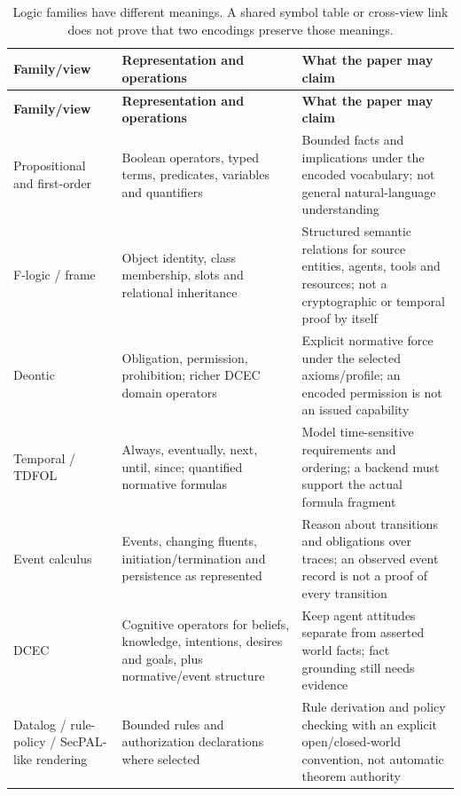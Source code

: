 \begingroup
\renewcommand{\thetable}{B1}
\begin{longtable}{@{}>{\raggedright\arraybackslash}p{.24\linewidth} >{\raggedright\arraybackslash}p{.32\linewidth} >{\raggedright\arraybackslash}p{.38\linewidth}@{}}
\caption{Logic families have different meanings. A shared symbol table or cross-view link does not prove that two encodings preserve those meanings.}\label{tab:B1}\\
\toprule
\textbf{Family/view} & \textbf{Representation and operations} & \textbf{What the paper may claim} \\
\midrule
\endfirsthead
\textbf{Family/view} & \textbf{Representation and operations} & \textbf{What the paper may claim} \\
\midrule
\endhead
\bottomrule
\endlastfoot
Propositional and first-order & Boolean operators, typed terms, predicates, variables and quantifiers & Bounded facts and implications under the encoded vocabulary; not general natural-language understanding \\[3pt]
F-logic / frame & Object identity, class membership, slots and relational inheritance & Structured semantic relations for source entities, agents, tools and resources; not a cryptographic or temporal proof by itself \\[3pt]
Deontic & Obligation, permission, prohibition; richer DCEC domain operators & Explicit normative force under the selected axioms/profile; an encoded permission is not an issued capability \\[3pt]
Temporal / TDFOL & Always, eventually, next, until, since; quantified normative formulas & Model time-sensitive requirements and ordering; a backend must support the actual formula fragment \\[3pt]
Event calculus & Events, changing fluents, initiation/termination and persistence as represented & Reason about transitions and obligations over traces; an observed event record is not a proof of every transition \\[3pt]
DCEC & Cognitive operators for beliefs, knowledge, intentions, desires and goals, plus normative/event structure & Keep agent attitudes separate from asserted world facts; fact grounding still needs evidence \\[3pt]
Datalog / rule-policy / SecPAL-like rendering & Bounded rules and authorization declarations where selected & Rule derivation and policy checking with an explicit open/closed-world convention, not automatic theorem authority \\[3pt]

\end{longtable}
